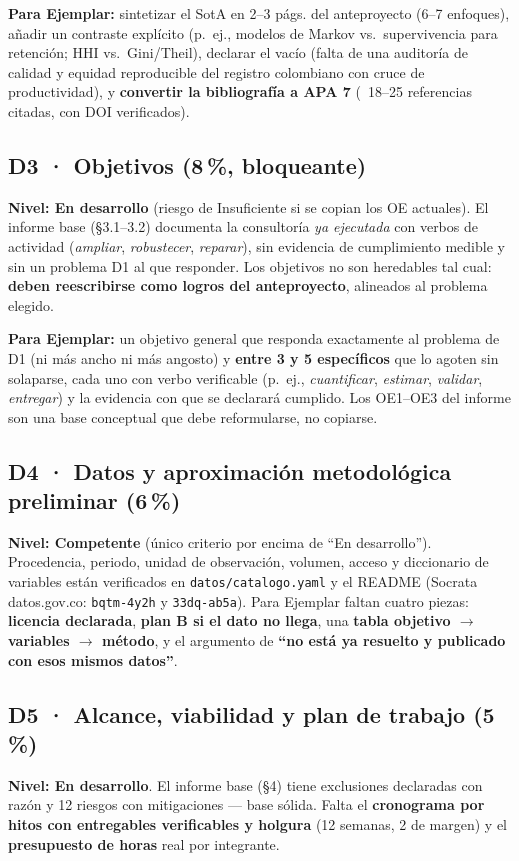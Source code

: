 \begin{tcolorbox}[nota]
\textbf{Para Ejemplar:} sintetizar el SotA en 2--3 págs. del anteproyecto
(6--7 enfoques), añadir un contraste explícito (p.~ej., modelos de Markov vs.\
supervivencia para retención; HHI vs.\ Gini/Theil), declarar el vacío (falta de
una auditoría de calidad y equidad reproducible del registro colombiano con
cruce de productividad), y \textbf{convertir la bibliografía a APA 7} (~18--25
referencias citadas, con DOI verificados).
\end{tcolorbox}

\subsection{D3 · Objetivos (8\,\%, bloqueante)}

\textbf{Nivel: En desarrollo} (riesgo de Insuficiente si se copian los OE
actuales). El informe base (\S3.1--3.2) documenta la consultoría \emph{ya
ejecutada} con verbos de actividad (\emph{ampliar}, \emph{robustecer},
\emph{reparar}), sin evidencia de cumplimiento medible y sin un problema D1 al
que responder. Los objetivos no son heredables tal cual: \textbf{deben
reescribirse como logros del anteproyecto}, alineados al problema elegido.

\begin{tcolorbox}[nota]
\textbf{Para Ejemplar:} un objetivo general que responda exactamente al
problema de D1 (ni más ancho ni más angosto) y \textbf{entre 3 y 5 específicos}
que lo agoten sin solaparse, cada uno con verbo verificable (p.~ej.,
\emph{cuantificar}, \emph{estimar}, \emph{validar}, \emph{entregar}) y la
evidencia con que se declarará cumplido. Los OE1--OE3 del informe son una base
conceptual que debe reformularse, no copiarse.
\end{tcolorbox}

\subsection{D4 · Datos y aproximación metodológica preliminar (6\,\%)}

\textbf{Nivel: Competente} (único criterio por encima de ``En desarrollo'').
Procedencia, periodo, unidad de observación, volumen, acceso y diccionario de
variables están verificados en \texttt{datos/catalogo.yaml} y el README
(Socrata datos.gov.co: \texttt{bqtm-4y2h} y \texttt{33dq-ab5a}). Para
Ejemplar faltan cuatro piezas: \textbf{licencia declarada}, \textbf{plan B si
el dato no llega}, una \textbf{tabla objetivo $\rightarrow$ variables
$\rightarrow$ método}, y el argumento de \textbf{``no está ya resuelto y
publicado con esos mismos datos''}.

\subsection{D5 · Alcance, viabilidad y plan de trabajo (5\,\%)}

\textbf{Nivel: En desarrollo}. El informe base (\S4) tiene exclusiones
declaradas con razón y 12 riesgos con mitigaciones — base sólida. Falta el
\textbf{cronograma por hitos con entregables verificables y holgura} (12
semanas, 2 de margen) y el \textbf{presupuesto de horas} real por integrante.
